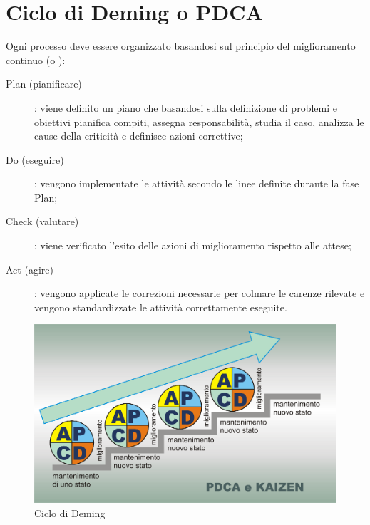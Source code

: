 \documentclass[PianoDiQualifica.tex]{subfiles}
\begin{document}
\appendix
		
\chapter{Ciclo di Deming o PDCA}
Ogni processo deve essere organizzato basandosi sul principio del miglioramento continuo (o ):
\begin{description}
	\item [Plan (pianificare)]: viene definito un piano che basandosi sulla definizione di problemi e obiettivi pianifica compiti, assegna responsabilità, studia il caso, analizza le cause della criticità e definisce azioni correttive; 
	\item [Do (eseguire)]: vengono implementate le attività secondo le linee definite durante la fase Plan;
	\item [Check (valutare)]: viene verificato l'esito delle azioni di miglioramento rispetto alle attese;
	\item [Act (agire)]: vengono applicate le correzioni necessarie per colmare le carenze rilevate e vengono standardizzate le attività correttamente eseguite.
\end{description}

\begin{figure}[htbp]
	\begin{center}
		\includegraphics[width=0.7\linewidth]{PDCAkaizen}
		\caption[Ciclo di Deming]{Ciclo di Deming}
		\label{fig:pdca}
	\end{center}
\end{figure}
\end{document}
